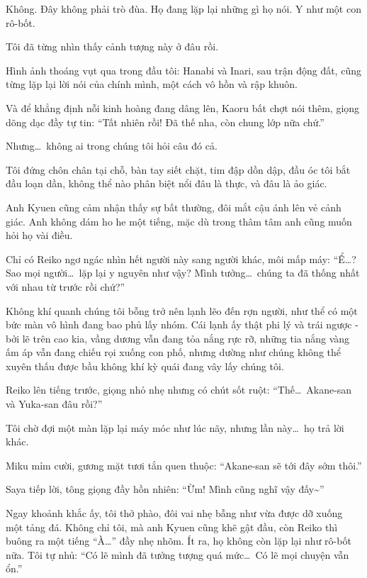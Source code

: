 \documentclass[../main.tex]{subfiles}
\begin{document}
Không. Đây không phải trò đùa. Họ đang lặp lại những gì họ nói. Y như một con rô-bốt.

Tôi đã từng nhìn thấy cảnh tượng này ở đâu rồi.

Hình ảnh thoáng vụt qua trong đầu tôi: Hanabi và Inari, sau trận động đất, cũng từng lặp lại lời nói của chính mình, một cách vô hồn và rập khuôn.

Và để khẳng định nỗi kinh hoàng đang dâng lên, Kaoru bất chợt nói thêm, giọng dõng dạc đầy tự tin: ``Tất nhiên rồi! Đã thế nha, còn chung lớp nữa chứ.''

Nhưng\dots\ không ai trong chúng tôi hỏi câu đó cả.

Tôi đứng chôn chân tại chỗ, bàn tay siết chặt, tim đập dồn dập, đầu óc tôi bắt đầu loạn dần, không thể nào phân biệt nổi đâu là thực, và đâu là ảo giác.

Anh Kyuen cũng cảm nhận thấy sự bất thường, đôi mắt cậu ánh lên vẻ cảnh giác. Anh không dám ho he một tiếng, mặc dù trong thâm tâm anh cũng muốn hỏi họ vài điều.

Chỉ có Reiko ngơ ngác nhìn hết người này sang người khác, môi mấp máy: ``Ể\dots? Sao mọi người\dots\ lặp lại y nguyên như vậy? Mình tưởng\dots\ chúng ta đã thống nhất với nhau từ trước rồi chứ?''

Không khí quanh chúng tôi bỗng trở nên lạnh lẽo đến rợn người, như thể có một bức màn vô hình đang bao phủ lấy nhóm. Cái lạnh ấy thật phi lý và trái ngược - bởi lẽ trên cao kia, vầng dương vẫn đang tỏa nắng rực rỡ, những tia nắng vàng ấm áp vẫn đang chiếu rọi xuống con phố, nhưng dường như chúng không thể xuyên thấu được bầu không khí kỳ quái đang vây lấy chúng tôi.

Reiko lên tiếng trước, giọng nhỏ nhẹ nhưng có chút sốt ruột: ``Thế\dots\ Akane-san và Yuka-san đâu rồi?''

Tôi chờ đợi một màn lặp lại máy móc như lúc nãy, nhưng lần này\dots\ họ trả lời khác.

Miku mỉm cười, gương mặt tươi tắn quen thuộc: ``Akane-san sẽ tới đây sớm thôi.''

Saya tiếp lời, tông giọng đầy hồn nhiên: ``Ừm! Mình cũng nghĩ vậy đấy\~{}''

Ngay khoảnh khắc ấy, tôi thở phào, đôi vai nhẹ bẫng như vừa được dỡ  xuống một tảng đá. Không chỉ tôi, mà anh Kyuen cũng khẽ gật đầu, còn Reiko thì buông ra một tiếng ``À\dots'' đầy nhẹ nhõm. Ít ra, họ không còn lặp lại như rô-bốt nữa. Tôi tự nhủ: ``Có lẽ mình đã tưởng tượng quá mức\dots\ Có lẽ mọi chuyện vẫn ổn.''
\end{document}
